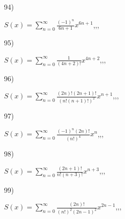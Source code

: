 \documentclass[11pt, ukrainian]{article}
\begin{document}
\par
\vspace{0.9cm}
94) \space 
{%
{$S(x)=\sum\limits_{n=0}^{\infty}{\frac{(-1)^n}{6n+1}}{x^{{6n+1}}}$},,, \par \smallskip  
}
\par
\vspace{0.9cm}
95) \space 
{%
{$S(x)=\sum\limits_{n=0}^{\infty}{\frac{1}{(4n+2)!}}{x^{{4n+2}}}$},,, \par \smallskip  
}
\par
\vspace{0.9cm}
96) \space 
{%
{$S(x)=\sum\limits_{n=0}^{\infty}{\frac{(2n)!(2n+1)!}{(n!(n+1)!)^2}}{x^{{n+1}}}$},,, \par \smallskip  
}
\par
\vspace{0.9cm}
97) \space 
{%
{$S(x)=\sum\limits_{n=0}^{\infty}{\frac{{(-1)^n}(2n)!}{(n!)^4}}{x^{{n}}}$},,, \par \smallskip  
}
\par
\vspace{0.9cm}
98) \space 
{%
{$S(x)=\sum\limits_{n=0}^{\infty}{\frac{(2n+1)!}{n!(n+3)!}}{x^{{n+3}}}$},,, \par \smallskip  
}
\par
\vspace{0.9cm}
99) \space 
{%
{$S(x)=\sum\limits_{n=0}^{\infty}{\frac{(2n)!}{{(n!)^2}{(2n-1)^2}}}{x^{{2n-1}}}$},,, \par \smallskip  
}
\end{document}

